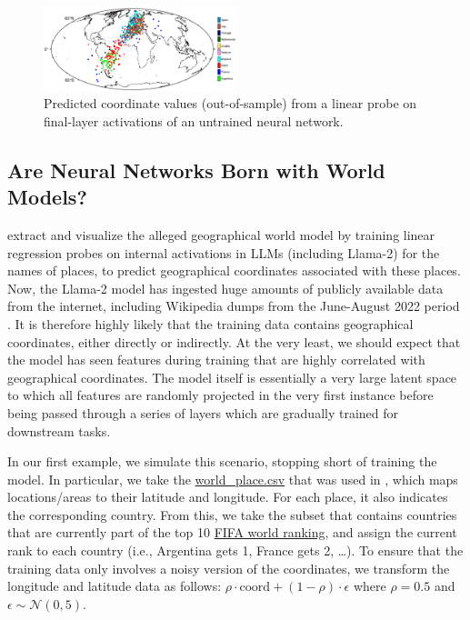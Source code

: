 \begin{figure}

{\centering \includegraphics[width=0.5\textwidth]{results/figures/map.png}

}

\caption{\label{fig-map}Predicted coordinate values (out-of-sample) from a linear probe on final-layer activations of an untrained neural network.}

\end{figure}

\subsection{Are Neural Networks Born with World Models?}\label{example-deep-learning}

\citet{gurnee2023languagev2} extract and visualize the alleged geographical world model by training linear regression probes on internal activations in LLMs (including Llama-2) for the names of places, to predict geographical coordinates associated with these places. Now, the Llama-2 model has ingested huge amounts of publicly available data from the internet, including Wikipedia dumps from the June-August 2022 period \citep{touvron2023llama}. It is therefore highly likely that the training data contains geographical coordinates, either directly or indirectly. At the very least, we should expect that the model has seen features during training that are highly correlated with geographical coordinates. The model itself is essentially a very large latent space to which all features are randomly projected in the very first instance before being passed through a series of layers which are gradually trained for downstream tasks.

In our first example, we simulate this scenario, stopping short of training the model. In particular, we take the \href{https://github.com/wesg52/world-models/blob/main/data/entity_datasets/world_place.csv}{world\_place.csv} that was used in \citet{gurnee2023languagev2}, which maps locations/areas to their latitude and longitude. For each place, it also indicates the corresponding country. From this, we take the subset that contains countries that are currently part of the top 10 \href{https://www.fifa.com/fifa-world-ranking/men?dateId=id14142}{FIFA world ranking}, and assign the current rank to each country (i.e., Argentina gets 1, France gets 2, \ldots{}). To ensure that the training data only involves a noisy version of the coordinates, we transform the longitude and latitude data as follows: \(\rho \cdot \text{coord} + (1-\rho) \cdot \epsilon\) where \(\rho=0.5\) and \(\epsilon \sim \mathcal{N}(0, 5)\).

